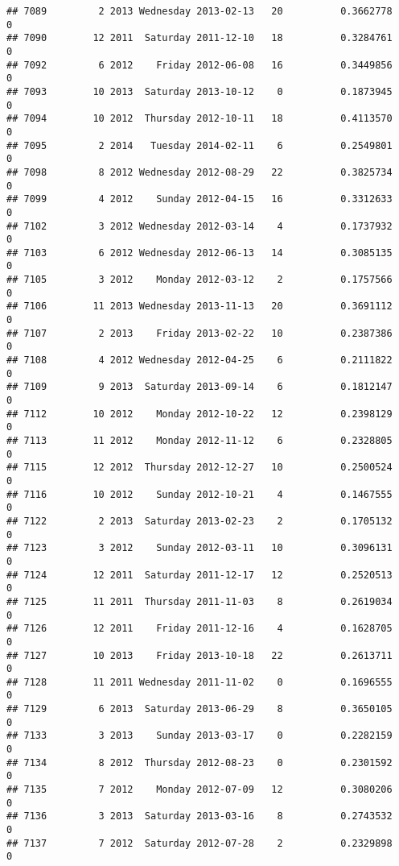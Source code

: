 \documentclass[
]{article}
\begin{document}
\begin{verbatim}
## 7089         2 2013 Wednesday 2013-02-13   20          0.3662778             0
## 7090        12 2011  Saturday 2011-12-10   18          0.3284761             0
## 7092         6 2012    Friday 2012-06-08   16          0.3449856             0
## 7093        10 2013  Saturday 2013-10-12    0          0.1873945             0
## 7094        10 2012  Thursday 2012-10-11   18          0.4113570             0
## 7095         2 2014   Tuesday 2014-02-11    6          0.2549801             0
## 7098         8 2012 Wednesday 2012-08-29   22          0.3825734             0
## 7099         4 2012    Sunday 2012-04-15   16          0.3312633             0
## 7102         3 2012 Wednesday 2012-03-14    4          0.1737932             0
## 7103         6 2012 Wednesday 2012-06-13   14          0.3085135             0
## 7105         3 2012    Monday 2012-03-12    2          0.1757566             0
## 7106        11 2013 Wednesday 2013-11-13   20          0.3691112             0
## 7107         2 2013    Friday 2013-02-22   10          0.2387386             0
## 7108         4 2012 Wednesday 2012-04-25    6          0.2111822             0
## 7109         9 2013  Saturday 2013-09-14    6          0.1812147             0
## 7112        10 2012    Monday 2012-10-22   12          0.2398129             0
## 7113        11 2012    Monday 2012-11-12    6          0.2328805             0
## 7115        12 2012  Thursday 2012-12-27   10          0.2500524             0
## 7116        10 2012    Sunday 2012-10-21    4          0.1467555             0
## 7122         2 2013  Saturday 2013-02-23    2          0.1705132             0
## 7123         3 2012    Sunday 2012-03-11   10          0.3096131             0
## 7124        12 2011  Saturday 2011-12-17   12          0.2520513             0
## 7125        11 2011  Thursday 2011-11-03    8          0.2619034             0
## 7126        12 2011    Friday 2011-12-16    4          0.1628705             0
## 7127        10 2013    Friday 2013-10-18   22          0.2613711             0
## 7128        11 2011 Wednesday 2011-11-02    0          0.1696555             0
## 7129         6 2013  Saturday 2013-06-29    8          0.3650105             0
## 7133         3 2013    Sunday 2013-03-17    0          0.2282159             0
## 7134         8 2012  Thursday 2012-08-23    0          0.2301592             0
## 7135         7 2012    Monday 2012-07-09   12          0.3080206             0
## 7136         3 2013  Saturday 2013-03-16    8          0.2743532             0
## 7137         7 2012  Saturday 2012-07-28    2          0.2329898             0

\end{verbatim}
\end{document}
